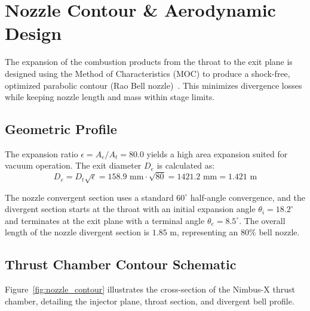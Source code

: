 \section{Nozzle Contour \& Aerodynamic Design}
The expansion of the combustion products from the throat to the exit plane is designed using the Method of Characteristics (MOC) to produce a shock-free, optimized parabolic contour (Rao Bell nozzle)~\cite{Anderson2003}. This minimizes divergence losses while keeping nozzle length and mass within stage limits.

\subsection{Geometric Profile}
The expansion ratio $\epsilon = A_e / A_t = 80.0$ yields a high area expansion suited for vacuum operation. The exit diameter $D_e$ is calculated as:
\begin{equation}
    D_e = D_t \sqrt{\epsilon} = 158.9 \text{~mm} \cdot \sqrt{80} = 1421.2 \text{~mm} = 1.421 \text{~m}
\end{equation}

The nozzle convergent section uses a standard $60^\circ$ half-angle convergence, and the divergent section starts at the throat with an initial expansion angle $\theta_i = 18.2^\circ$ and terminates at the exit plane with a terminal angle $\theta_e = 8.5^\circ$. The overall length of the nozzle divergent section is $1.85\text{~m}$, representing an $80\%$ bell nozzle.

\subsection{Thrust Chamber Contour Schematic}
Figure~\ref{fig:nozzle_contour} illustrates the cross-section of the Nimbus-X thrust chamber, detailing the injector plane, throat section, and divergent bell profile.

